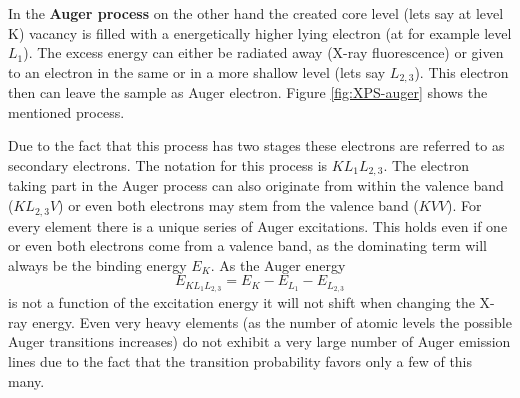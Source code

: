  In the \textbf{Auger process}  on the other hand the created core level (lets say at level K) vacancy is filled with a energetically higher lying electron (at for example level $L_1$). The excess energy can either be radiated away (X-ray fluorescence) or given to an electron in the same or in a more shallow level (lets say $L_{2,3}$). This electron then can leave the sample as Auger electron. Figure \ref{fig:XPS-auger} shows the mentioned process. 
 
 Due to the fact that this process has two stages these electrons are referred to as secondary electrons. The notation for this process is $KL_1L_{2,3}$. The electron taking part in the Auger process can also originate from within the valence band ($KL_{2,3}V$) or even both electrons may stem from the valence band ($KVV$). For every element there is a unique series of Auger excitations. This holds even if one or even both electrons come from a valence band, as the dominating term will always be the binding energy $E_K$. As the Auger energy $$E_{KL_1L_{2,3}}=E_K-E_{L_1}-E_{L_{2,3}}$$ is not a function of the excitation energy it will not shift when changing the X-ray energy. Even very heavy elements (as the number of atomic levels the possible Auger transitions increases) do not exhibit a very large number of Auger emission lines due to the fact that the transition probability favors only a few of this many. \cite{Briggs_90}

